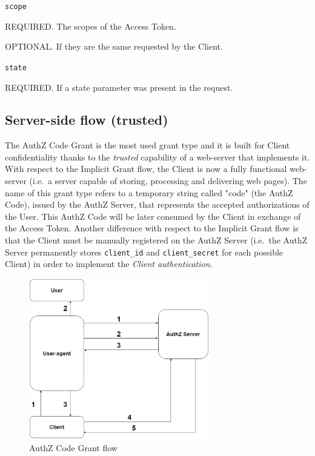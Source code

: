 \documentclass[a4paper,12pt]{article}
\def\ie{i.e.\xspace}
\begin{document}
\texttt{scope}

\hspace{0.5cm}REQUIRED. The scopes of the Access Token.

\hspace{0.5cm}OPTIONAL. If they are the same requested by the Client.

\texttt{state}

\hspace{0.5cm}REQUIRED. If a state parameter was present in the request.



\subsection{Server-side flow (trusted)}
\label{authcg}

The AuthZ Code Grant is the most used grant type and it is built for Client confidentiality thanks to the \textit{trusted} capability of a web-server that implements it. With respect to the Implicit Grant flow, the Client is now a fully functional web-server (\ie\ a server capable of storing, processing and delivering web pages). The name of this grant type refers to a temporary string called "code" (the AuthZ Code), issued by the AuthZ Server, that represents the accepted authorizations of the User. This AuthZ Code will be later consumed by the Client in exchange of the Access Token. Another difference with respect to the Implicit Grant flow is that the Client must be manually registered on the AuthZ Server (\ie\ the AuthZ Server permanently stores \texttt{client\_id} and \texttt{client\_secret} for each possible Client) in order to implement the \textit{Client authentication}. 

\begin{figure}[ht]
    \centering
    \includegraphics[width=0.7\textwidth]{figures/server_flow_general.png}
    \caption{AuthZ Code Grant flow}
    \label{fig:serverflow}
\end{figure}
\end{document}
